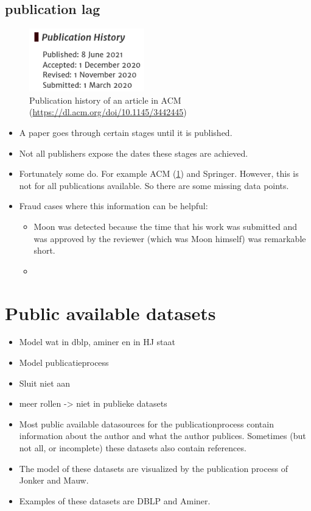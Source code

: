 \documentclass{ou-report}
\newcommand{\outline}[1]{{\color{blue} #1}}
\begin{document}
\subsection{publication lag}
\begin{figure}[H]
\centering
\includegraphics[width=5cm]{ACM_Digital_Threats_Research_and_Practice.png}
\caption{Publication history of an article in ACM (\url{https://dl.acm.org/doi/10.1145/3442445})}
\label{fig:acm_dates}
\end{figure}
\begin{itemize}
    \item A paper goes through certain stages until it is published.
    \item Not all publishers expose the dates these stages are achieved. 
    \item Fortunately some do. For example ACM (\ref{fig:acm_dates}) and Springer. However, this is not for all publications available. So there are some missing data points.
    \item Fraud cases where this information can be helpful:
    \begin{itemize}
        \item Moon was detected because the time that his work was submitted and was approved by the reviewer (which was Moon himself) was remarkable short.
        \item ~\cite{SNCMBL2021}
    \end{itemize}
\end{itemize}

\section{Public available datasets}

\outline{
\begin{itemize}
    \item Model wat in dblp, aminer en in HJ staat
    \item Model publicatieprocess
    \item Sluit niet aan
    \item meer rollen -> niet in publieke datasets
    \item Most public available datasources for the publicationprocess contain information about the author and what the author publices. Sometimes (but not all, or incomplete) these datasets also contain references.
    \item The model of these datasets are visualized by the publication process of Jonker and Mauw.
    \item Examples of these datasets are DBLP and Aminer.
\end{itemize}
}
\end{document}
